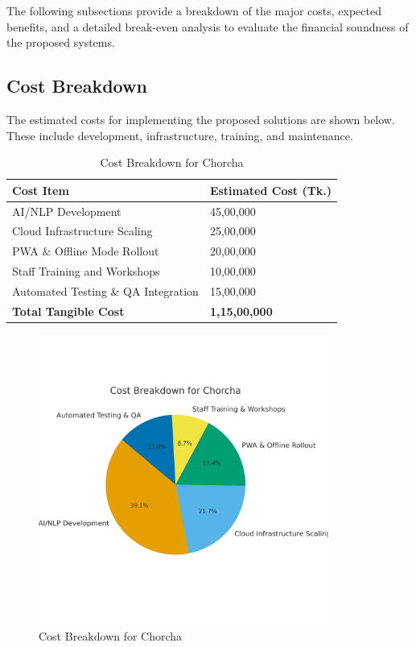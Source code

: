 \documentclass[12pt,a4paper,oneside]{book}
\begin{document}
The following subsections provide a breakdown of the major costs, expected benefits, and a detailed break-even analysis to evaluate the financial soundness of the proposed systems.

\subsection{Cost Breakdown}

The estimated costs for implementing the proposed solutions are shown below. These include development, infrastructure, training, and maintenance.

\begin{table}[H]
\centering
\caption{Cost Breakdown for Chorcha}
\small
\begin{tabular}{|L{7.5cm}|C{3cm}|}
\hline
\textbf{Cost Item} & \textbf{Estimated Cost (Tk.)} \\
\hline
AI/NLP Development & 45,00,000 \\
\hline
Cloud Infrastructure Scaling & 25,00,000 \\
\hline
PWA \& Offline Mode Rollout & 20,00,000 \\
\hline
Staff Training and Workshops & 10,00,000 \\
\hline
Automated Testing \& QA Integration & 15,00,000 \\
\hline
\textbf{Total Tangible Cost} & \textbf{1,15,00,000} \\
\hline
\end{tabular}
\end{table}

\begin{figure}[H]
    \centering
    \includegraphics[width=0.85\textwidth]{cost_breakdown_pie.png}
    \caption{Cost Breakdown for Chorcha}
    \end{figure}
\end{document}
